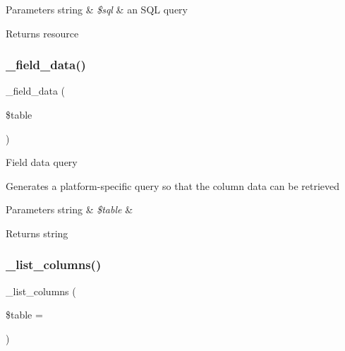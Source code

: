 \begin{DoxyParams}[1]{Parameters}
string & {\em \$sql} & an S\+QL query \\
\hline
\end{DoxyParams}
\begin{DoxyReturn}{Returns}
resource 
\end{DoxyReturn}
\mbox{\label{class_c_i___d_b__odbc__driver_a95247d9671893adc3444cb184ad32ea1}} 
\subsubsection{\texorpdfstring{\+\_\+field\+\_\+data()}{\_field\_data()}}
{\footnotesize\ttfamily \+\_\+field\+\_\+data (\begin{DoxyParamCaption}\item[{}]{\$table }\end{DoxyParamCaption})\hspace{0.3cm}{\ttfamily [protected]}}

Field data query

Generates a platform-\/specific query so that the column data can be retrieved


\begin{DoxyParams}[1]{Parameters}
string & {\em \$table} & \\
\hline
\end{DoxyParams}
\begin{DoxyReturn}{Returns}
string 
\end{DoxyReturn}
\mbox{\label{class_c_i___d_b__odbc__driver_a7ccb7f9c301fe7f0a9db701254142b63}} 
\subsubsection{\texorpdfstring{\+\_\+list\+\_\+columns()}{\_list\_columns()}}
{\footnotesize\ttfamily \+\_\+list\+\_\+columns (\begin{DoxyParamCaption}\item[{}]{\$table = {\ttfamily \textquotesingle{}\textquotesingle{}} }\end{DoxyParamCaption})\hspace{0.3cm}{\ttfamily [protected]}}


